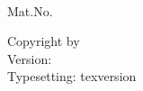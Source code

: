 \thispagestyle{empty}
\vspace*{3\baselineskip}
\noindent
\fullname\\
Mat.No. \matnr\\
\email


\vfill
\noindent
Copyright \thyear{} by \fullname\\
Version: \thday{} \thmonth{} \thyear\\
Typesetting: {texversion}



\cleardoublepage
